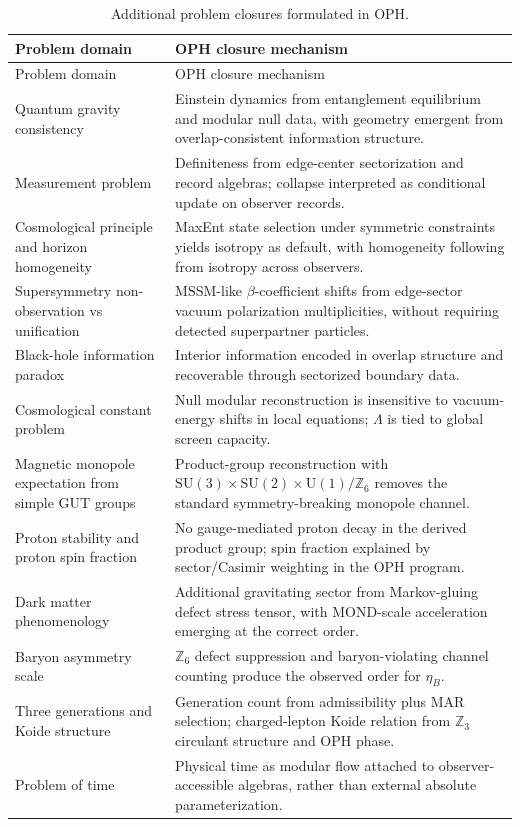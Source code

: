 \documentclass[11pt]{article}
\newcommand{\SU}{\mathrm{SU}}
\newcommand{\U}{\mathrm{U}}
\begin{document}
\begin{longtable}{p{} p{}}
\caption{Additional problem closures formulated in OPH.}\label{tab:additional-closures}\\
\toprule
Problem domain & OPH closure mechanism \\
\midrule
\endfirsthead
\toprule
Problem domain & OPH closure mechanism \\
\midrule
\endhead
\bottomrule
\endfoot
Quantum gravity consistency & Einstein dynamics from entanglement equilibrium and modular null data, with geometry emergent from overlap-consistent information structure. \\
Measurement problem & Definiteness from edge-center sectorization and record algebras; collapse interpreted as conditional update on observer records. \\
Cosmological principle and horizon homogeneity & MaxEnt state selection under symmetric constraints yields isotropy as default, with homogeneity following from isotropy across observers. \\
Supersymmetry non-observation vs unification & MSSM-like $\beta$-coefficient shifts from edge-sector vacuum polarization multiplicities, without requiring detected superpartner particles. \\
Black-hole information paradox & Interior information encoded in overlap structure and recoverable through sectorized boundary data. \\
Cosmological constant problem & Null modular reconstruction is insensitive to vacuum-energy shifts in local equations; $\Lambda$ is tied to global screen capacity. \\
Magnetic monopole expectation from simple GUT groups & Product-group reconstruction with $\SU(3)\times\SU(2)\times\U(1)/\mathbb{Z}_6$ removes the standard symmetry-breaking monopole channel. \\
Proton stability and proton spin fraction & No gauge-mediated proton decay in the derived product group; spin fraction explained by sector/Casimir weighting in the OPH program. \\
Dark matter phenomenology & Additional gravitating sector from Markov-gluing defect stress tensor, with MOND-scale acceleration emerging at the correct order. \\
Baryon asymmetry scale & $\mathbb{Z}_6$ defect suppression and baryon-violating channel counting produce the observed order for $\eta_B$. \\
Three generations and Koide structure & Generation count from admissibility plus MAR selection; charged-lepton Koide relation from $\mathbb{Z}_3$ circulant structure and OPH phase. \\
Problem of time & Physical time as modular flow attached to observer-accessible algebras, rather than external absolute parameterization. \\
\end{longtable}
\end{document}
